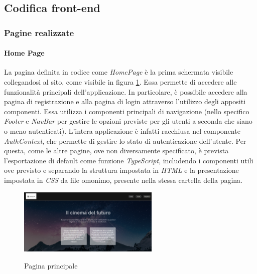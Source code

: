 \newpage
\subsection{Codifica front-end}

\subsubsection{Pagine realizzate}

\paragraph{Home Page}

La pagina definita in codice come \textit{HomePage} è la prima schermata visibile collegandosi al sito, come visibile in figura \ref{fig:pagina-principale}. Essa permette di accedere alle funzionalità principali dell'applicazione.
In particolare, è possibile accedere alla pagina di registrazione e alla pagina di login attraverso l'utilizzo degli appositi componenti.
Essa utilizza i componenti principali di navigazione (nello specifico \textit{Footer} e \textit{NavBar} per gestire le opzioni 
previste per gli utenti a seconda che siano o meno autenticati). L'intera applicazione è infatti racchiusa nel componente \textit{AuthContext}, che permette di gestire lo stato di autenticazione dell'utente.
Per questa, come le altre pagine, ove non diversamente specificato, è prevista l'esportazione di default come funzione \textit{TypeScript}, includendo i componenti utili ove previsto e 
separando la struttura impostata in \textit{HTML} e la presentazione impostata in \textit{CSS} da file omonimo, presente nella stessa cartella della pagina.

\begin{figure}[h]
    \centering
    \includegraphics[width=0.6\textwidth, alt={Pagina principale dell'applicazione}]{immagini/frontend/home.png}
    \caption{Pagina principale}\label{fig:pagina-principale}
\end{figure}

